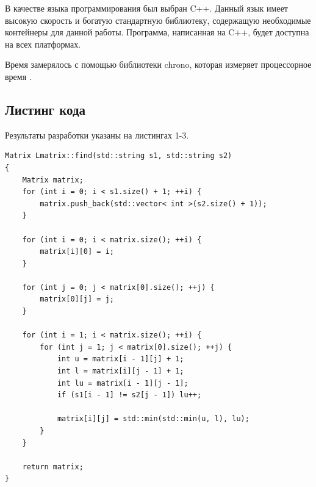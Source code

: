\documentclass[a4paper,12pt]{article}
\begin{document}
В качестве языка программирования был выбран C++.
Данный язык имеет высокую скорость и богатую стандартную библиотеку,
содержащую необходимые контейнеры для данной работы. Программа, написанная на C++,
будет доступна на всех платформах.

Время замерялось с помощью библиотеки chrono, которая измеряет процессорное время \cite{chrono}.

\subsection{Листинг кода}

Результаты разработки указаны на листингах 1-3.

\begin{lstlisting}[caption=Расстояние Левенштейна матричный метод]
Matrix Lmatrix::find(std::string s1, std::string s2)
{
    Matrix matrix;
    for (int i = 0; i < s1.size() + 1; ++i) {
        matrix.push_back(std::vector< int >(s2.size() + 1));
    }

    for (int i = 0; i < matrix.size(); ++i) {
        matrix[i][0] = i;
    }

    for (int j = 0; j < matrix[0].size(); ++j) {
        matrix[0][j] = j;
    }

    for (int i = 1; i < matrix.size(); ++i) {
        for (int j = 1; j < matrix[0].size(); ++j) {
            int u = matrix[i - 1][j] + 1;
            int l = matrix[i][j - 1] + 1;
            int lu = matrix[i - 1][j - 1];
            if (s1[i - 1] != s2[j - 1]) lu++;

            matrix[i][j] = std::min(std::min(u, l), lu);
        }
    }

    return matrix;
}
\end{lstlisting}
\end{document}
